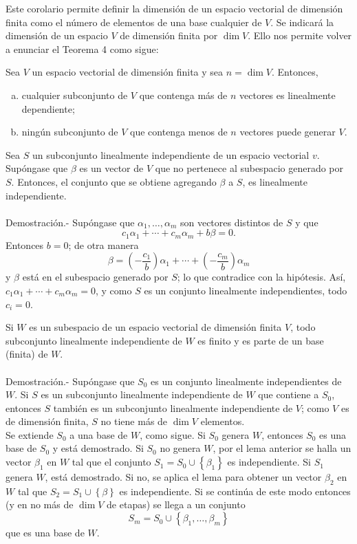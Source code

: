 Este corolario permite definir la dimensión de un espacio vectorial de dimensión finita como el número de elementos de una base cualquier de $V$. Se indicará la dimensión de un espacio $V$ de dimensión finita por $\dim V$. Ello nos permite volver a enunciar el Teorema 4 como sigue:

\begin{cor}
    Sea $V$ un espacio vectorial de dimensión finita y sea $n=\dim V$. Entonces,
    \begin{enumerate}[(a)]
	\item cualquier subconjunto de $V$ que contenga más de $n$ vectores es linealmente dependiente;
	\item ningún subconjunto de $V$ que contenga menos de $n$ vectores puede generar $V$.
    \end{enumerate}
\end{cor}

\begin{lema}
    Sea $S$ un subconjunto linealmente independiente de un espacio vectorial $v$. Supóngase que $\beta$ es un vector de $V$ que no pertenece al subespacio generado por $S$. Entonces, el conjunto que se obtiene agregando $\beta$ a $S$, es linealmente independiente.\\\\
	Demostración.-\; Supóngase que $\alpha_1,\ldots,\alpha_m$ son vectores distintos de $S$ y que 
	$$c_1\alpha_1+\cdots+c_m\alpha_m+b\beta=0.$$
	Entonces $b=0$; de otra manera
	$$\beta=\left(-\dfrac{c_1}{b}\right)\alpha_1+\cdots+\left(-\dfrac{c_m}{b}\right)\alpha_m$$
	y $\beta$ está en el subespacio generado por $S$; lo que contradice con la hipótesis. Así, $c_1\alpha_1+\cdots+c_m\alpha_m=0$, y como $S$ es un conjunto linealmente independientes, todo $c_i=0$.
\end{lema}

\begin{teo}
    Si $W$ es un subespacio de un espacio vectorial de dimensión finita $V$, todo subconjunto linealmente independiente de $W$ es finito y es parte de un base (finita) de $W$.\\\\
	Demostración.-\; Supóngase que $S_0$ es un conjunto linealmente independientes de $W$. Si $S$ es un subconjunto linealmente independiente de $W$ que contiene a $S_0$, entonces $S$ también es un subconjunto linealmente independiente de $V$; como $V$ es de dimensión finita, $S$ no tiene más de $\dim V$ elementos.\\
	Se extiende $S_0$ a una base de $W$, como sigue. Si $S_0$ genera $W$, entonces $S_0$ es una base de $S_0$ y está demostrado. Si $S_0$ no genera $W$, por el lema anterior se halla un vector $\beta_1$ en $W$ tal que el conjunto $S_1=S_0\cup \left\{\beta_1\right\}$ es independiente. Si $S_1$ genera $W$, está demostrado. Si no, se aplica el lema para obtener un vector $\beta_2$ en $W$ tal que $S_2=S_1\cup \left\{\beta\right\}$ es independiente. Si se continúa de este modo entonces (y en no más de $\dim V$ de etapas) se llega a un conjunto
	$$S_m=S_0\cup \left\{\beta_1,\ldots,\beta_m\right\}$$
	que es una base de $W$.
\end{teo}

